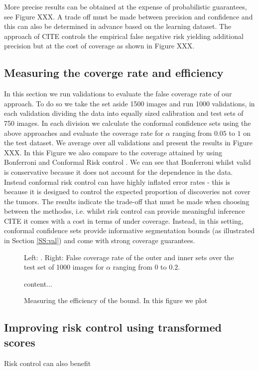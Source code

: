 More precise results can be obtained at the expense of probabilistic guarantees, see Figure XXX. A trade off must be made between precision and confidence and this can also be determined in advance based on the learning dataset. The approach of CITE controls the empirical false negative risk yielding additional precision but at the cost of coverage as shown in Figure XXX. 

\subsection{Measuring the coverge rate and efficiency}
In this section we run validations to evaluate the false coverage rate of our approach. To do so we take the set aside 1500 images and run 1000 validations, in each validation dividing the data into equally sized calibration and test sets of 750 images. In each division we calculate the conformal confidence sets using the above approaches and evaluate the coverage rate for $\alpha$ ranging from $0.05$ to $1$ on the test dataset. We average over all validations and present the results in Figure XXX. In this Figure we also compare to the coverage attained by using Bonferroni and Conformal Risk control \cite{}. We can see that Bonferroni whilst valid is conservative because it does not account for the dependence in the data. Instead conformal risk control can have highly inflated error rates - this is because it is designed to control the expected proportion of discoveries not cover the tumors. The results indicate the trade-off that must be made when choosing between the methodss, i.e. whilst risk control can provide meaningful inference CITE it comes with a cost in terms of under coverage. Instead, in this setting, conformal confidence sets provide informative segmentation bounds (as illustrated in Section \ref{SS:val}) and come with strong coverage guarantees.

\begin{figure}
	
	\caption{Left: . Right: False coverage rate of the outer and inner sets over the test set of 1000 images for $\alpha$ ranging from 0 to $0.2$.  }\label{fig:dist}
\end{figure}

\begin{figure}
	content...
	\caption{Measuring the efficiency of the bound. In this figure we plot }
\end{figure}

\subsection{Improving risk control using transformed scores}
Risk control can also benefit  
 


